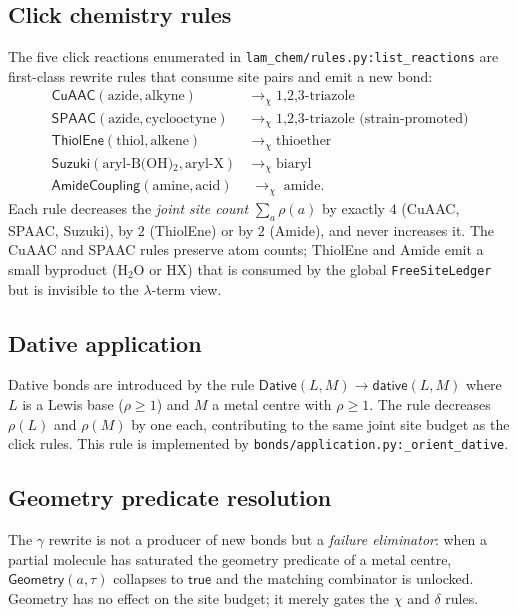 \documentclass{article}
\theoremstyle{definition}
\newcommand{\stepstoChem}{\longrightarrow_{\chi}}
\begin{document}
\subsection{Click chemistry rules}
The five click reactions enumerated in \texttt{lam\_chem/rules.py:list\_reactions}
are first-class rewrite rules that consume site pairs and emit a new bond:
\begin{align*}
  \mathsf{CuAAC}(\text{azide},\text{alkyne})
    &\;\stepstoChem\; \text{1,2,3-triazole} \\
  \mathsf{SPAAC}(\text{azide},\text{cyclooctyne})
    &\;\stepstoChem\; \text{1,2,3-triazole (strain-promoted)} \\
  \mathsf{ThiolEne}(\text{thiol},\text{alkene})
    &\;\stepstoChem\; \text{thioether} \\
  \mathsf{Suzuki}(\text{aryl-B(OH)$_2$},\text{aryl-X})
    &\;\stepstoChem\; \text{biaryl} \\
  \mathsf{AmideCoupling}(\text{amine},\text{acid})
    &\;\stepstoChem\; \text{amide}.
\end{align*}
Each rule decreases the \emph{joint site count}
$\sum_a \rho(a)$ by exactly $4$ (CuAAC, SPAAC, Suzuki), by $2$
(ThiolEne) or by $2$ (Amide), and never increases it. The CuAAC and SPAAC
rules preserve atom counts; ThiolEne and Amide emit a small byproduct
(\ensuremath{\mathrm{H_2O}} or \ensuremath{\mathrm{HX}}) that is consumed by the global
\texttt{FreeSiteLedger} but is invisible to the $\lambda$-term view.

\subsection{Dative application}
Dative bonds are introduced by the rule
$\mathsf{Dative}(L,M) \to \mathsf{dative}(L,M)$ where $L$ is a Lewis base
($\rho \ge 1$) and $M$ a metal centre with $\rho \ge 1$. The rule decreases
$\rho(L)$ and $\rho(M)$ by one each, contributing to the same joint site
budget as the click rules. This rule is implemented by
\texttt{bonds/application.py:\_orient\_dative}.

\subsection{Geometry predicate resolution}
The $\gamma$ rewrite is not a producer of new bonds but a \emph{failure
eliminator}: when a partial molecule has saturated the geometry predicate
of a metal centre, $\mathsf{Geometry}(a,\tau)$ collapses to $\mathsf{true}$
and the matching combinator is unlocked. Geometry has no effect on the site
budget; it merely gates the $\chi$ and $\delta$ rules.
\end{document}
